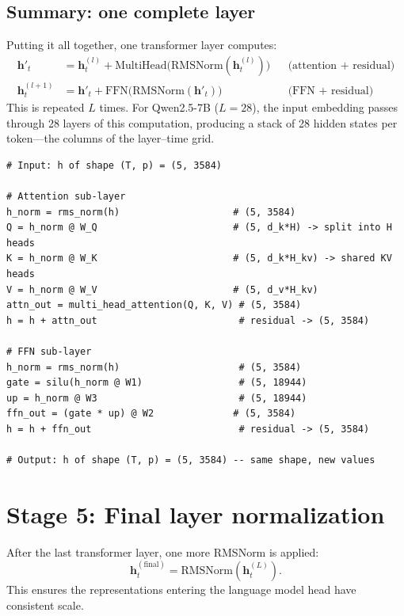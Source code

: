 \documentclass[11pt, twoside, openright]{memoir}
\begin{document}
\subsection{Summary: one complete layer}

Putting it all together, one transformer layer computes:
\begin{align*}
  \mathbf{h}'_t &= \mathbf{h}^{(l)}_t + \text{MultiHead}\bigl(\text{RMSNorm}(\mathbf{h}^{(l)}_t)\bigr)
  && \text{(attention + residual)} \\
  \mathbf{h}^{(l+1)}_t &= \mathbf{h}'_t + \text{FFN}\bigl(\text{RMSNorm}(\mathbf{h}'_t)\bigr)
  && \text{(FFN + residual)}
\end{align*}
This is repeated $L$ times.  For Qwen2.5-7B ($L = 28$), the input embedding
passes through 28 layers of this computation, producing a stack of 28 hidden
states per token---the columns of the layer--time grid.

\begin{lstlisting}[caption={Tracing the shapes through one layer (pseudocode)}]
# Input: h of shape (T, p) = (5, 3584)

# Attention sub-layer
h_norm = rms_norm(h)                    # (5, 3584)
Q = h_norm @ W_Q                        # (5, d_k*H) -> split into H heads
K = h_norm @ W_K                        # (5, d_k*H_kv) -> shared KV heads
V = h_norm @ W_V                        # (5, d_v*H_kv)
attn_out = multi_head_attention(Q, K, V) # (5, 3584)
h = h + attn_out                         # residual -> (5, 3584)

# FFN sub-layer
h_norm = rms_norm(h)                     # (5, 3584)
gate = silu(h_norm @ W1)                 # (5, 18944)
up = h_norm @ W3                         # (5, 18944)
ffn_out = (gate * up) @ W2              # (5, 3584)
h = h + ffn_out                          # residual -> (5, 3584)

# Output: h of shape (T, p) = (5, 3584) -- same shape, new values
\end{lstlisting}

\section{Stage 5: Final layer normalization}

After the last transformer layer, one more RMSNorm is applied:
\[
  \mathbf{h}^{(\text{final})}_t = \text{RMSNorm}(\mathbf{h}^{(L)}_t).
\]
This ensures the representations entering the language model head have
consistent scale.
\end{document}
